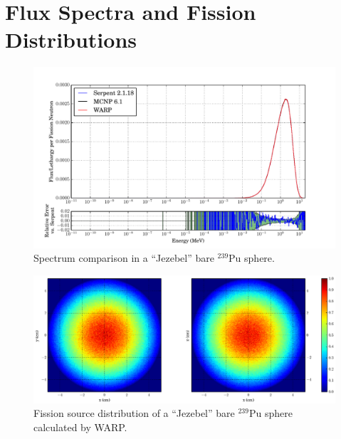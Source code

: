
\section{Flux Spectra and Fission Distributions}

\begin{figure}[h!] 
\centering
\includegraphics[width=\textwidth,trim= 1cm 0cm 1cm 0cm]{graphics/finalresults/godiva_spec-6.pdf}
\caption{Spectrum comparison in a ``Jezebel'' bare $^{239}$Pu sphere. \label{godiva_spec} }
\end{figure}

\begin{figure}[h!]
\centering
\includegraphics[width=\textwidth,trim= 5cm 0cm 7cm 0cm]{graphics/finalresults/godiva_fiss-6.eps}
\caption{Fission source distribution of a ``Jezebel'' bare $^{239}$Pu sphere calculated by WARP. \label{godiva_fiss} }
\end{figure}


